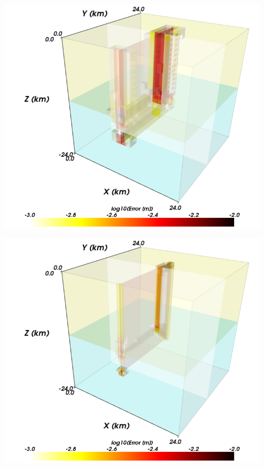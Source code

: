 \documentclass[pdftex,cig,slideColor]{pp4slides}
\begin{document}
  \vfill
 \begin{center}
    \includegraphics[scale=0.65]{figs/strikeslipnog_err_hex8_1000m}
  \end{center}
  \vfill




  \vfill
 \begin{center}
    \includegraphics[scale=0.65]{figs/strikeslipnog_err_hex8_0500m}
  \end{center}
  \vfill
\end{document}
